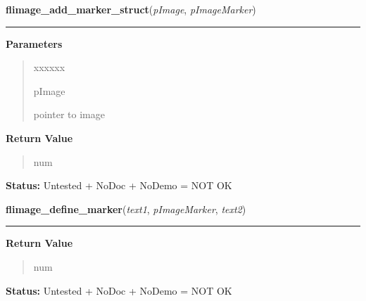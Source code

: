 \hspace{.8\funcindent}\begin{boxedminipage}{\funcwidth}

    \raggedright \textbf{flimage\_add\_marker\_struct}(\textit{pImage}, \textit{pImageMarker})

    \vspace{-1.5ex}

    \rule{\textwidth}{0.5\fboxrule}
\setlength{\parskip}{2ex}
\setlength{\parskip}{1ex}
      \textbf{Parameters}
      \vspace{-1ex}

      \begin{quote}
        \begin{Ventry}{xxxxxx}

          \item[pImage]

          pointer to image

        \end{Ventry}

      \end{quote}

      \textbf{Return Value}
    \vspace{-1ex}

      \begin{quote}
      num

      \end{quote}

\textbf{Status:} Untested + NoDoc + NoDemo = NOT OK



    \end{boxedminipage}

    \label{xformslib:flflimage:flimage_define_marker}

    \vspace{0.5ex}

\hspace{.8\funcindent}\begin{boxedminipage}{\funcwidth}

    \raggedright \textbf{flimage\_define\_marker}(\textit{text1}, \textit{pImageMarker}, \textit{text2})

    \vspace{-1.5ex}

    \rule{\textwidth}{0.5\fboxrule}
\setlength{\parskip}{2ex}
\setlength{\parskip}{1ex}
      \textbf{Return Value}
    \vspace{-1ex}

      \begin{quote}
      num

      \end{quote}

\textbf{Status:} Untested + NoDoc + NoDemo = NOT OK



    \end{boxedminipage}

